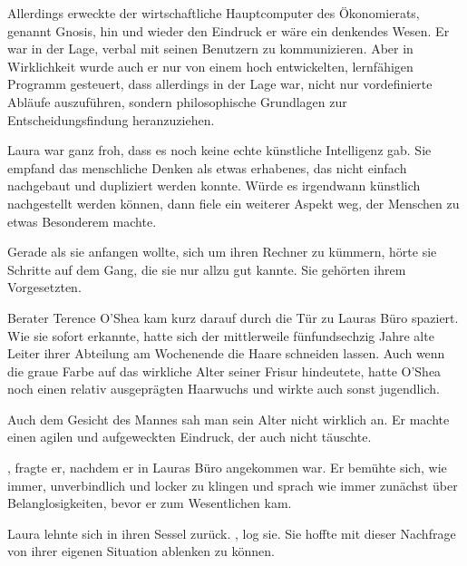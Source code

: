 \par

Allerdings erweckte der wirtschaftliche Hauptcomputer des Ökonomierats, genannt Gnosis, hin und wieder den Eindruck er wäre ein denkendes Wesen. Er war in der Lage, verbal mit seinen Benutzern zu kommunizieren. Aber in Wirklichkeit wurde auch er nur von einem hoch entwickelten, lernfähigen Programm gesteuert, dass allerdings in der Lage war, nicht nur vordefinierte Abläufe auszuführen, sondern philosophische Grundlagen zur Entscheidungsfindung heranzuziehen.

\par

Laura war ganz froh, dass es noch keine echte künstliche Intelligenz gab. Sie empfand das menschliche Denken als etwas erhabenes, das nicht einfach nachgebaut und dupliziert werden konnte. Würde es irgendwann künstlich nachgestellt werden können, dann fiele ein weiterer Aspekt weg, der Menschen zu etwas Besonderem machte. 

\par

Gerade als sie anfangen wollte, sich um ihren Rechner zu kümmern, hörte sie Schritte auf dem Gang, die sie nur allzu gut kannte. Sie gehörten ihrem Vorgesetzten.

\par

Berater Terence O’Shea kam kurz darauf durch die Tür zu Lauras Büro spaziert. Wie sie sofort erkannte, hatte sich der mittlerweile fünfundsechzig Jahre alte Leiter ihrer Abteilung am Wochenende die Haare schneiden lassen. Auch wenn die graue Farbe auf das wirkliche Alter seiner Frisur hindeutete, hatte O’Shea noch einen relativ ausgeprägten Haarwuchs und wirkte auch sonst jugendlich.

\par

Auch dem Gesicht des Mannes sah man sein Alter nicht wirklich an. Er machte einen agilen und aufgeweckten Eindruck, der auch nicht täuschte.

\par

, fragte er, nachdem er in Lauras Büro angekommen war. Er bemühte sich, wie immer, unverbindlich und locker zu klingen und sprach wie immer zunächst über Belanglosigkeiten, bevor er zum Wesentlichen kam.

\par

Laura lehnte sich in ihren Sessel zurück. , log sie.  Sie hoffte mit dieser Nachfrage von ihrer eigenen Situation ablenken zu können.

